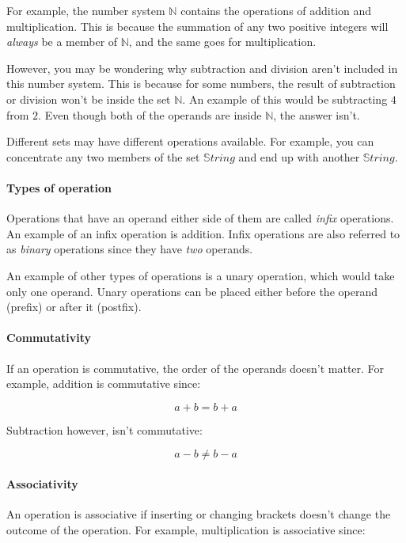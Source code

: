 For example, the number system $\mathbb{N}$ contains the operations of addition
and multiplication. This is because the summation of any two positive integers
will {\it always} be a member of $\mathbb{N}$, and the same goes for
multiplication.

However, you may be wondering why subtraction and division aren't included in
this number system. This is because for some numbers, the result of subtraction
or division won't be inside the set $\mathbb{N}$. An example of this would be
subtracting $4$ from $2$. Even though both of the operands are inside
$\mathbb{N}$, the answer isn't.

Different sets may have different operations available. For example, you can
concentrate any two members of the set $\mathbb{S}tring$ and end up with another
$\mathbb{S}tring$.

\paragraph{Types of operation} Operations that have an operand either side of
them are called {\it infix} operations. An example of an infix operation is
addition. Infix operations are also referred to as {\it binary} operations since
they have {\it two} operands.

An example of other types of operations is a unary operation, which would take
only one operand. Unary operations can be placed either before the operand
(prefix) or after it (postfix).

\paragraph{Commutativity} If an operation is commutative, the order of the
operands doesn't matter. For example, addition is commutative since:

\begin{dmath*}
	a + b = b + a
\end{dmath*}

Subtraction however, isn't commutative:

\begin{dmath*}
	a - b \neq b - a
\end{dmath*}

\paragraph{Associativity}

An operation is associative if inserting or changing brackets doesn't change the
outcome of the operation. For example, multiplication is associative since:


